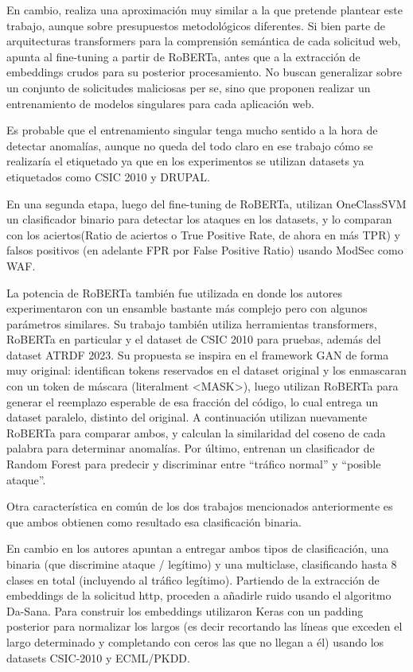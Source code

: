 \documentclass[12pt, a4paper]{article}
\begin{document}
En cambio, \cite{montes2021web} realiza una aproximación muy similar a la que pretende plantear  este trabajo, aunque sobre presupuestos metodológicos diferentes. Si bien parte de arquitecturas transformers para la comprensión semántica de cada solicitud web, apunta al fine-tuning a partir de RoBERTa, antes que a la extracción de embeddings crudos para su posterior procesamiento. No buscan generalizar sobre un conjunto de solicitudes maliciosas per se, sino que proponen realizar un entrenamiento de modelos singulares para cada aplicación web.

Es probable que el entrenamiento singular tenga mucho sentido a la hora de detectar anomalías, aunque no queda del todo claro en ese trabajo cómo se realizaría el etiquetado ya que en los experimentos se utilizan datasets ya etiquetados como CSIC 2010 y DRUPAL.

En una segunda etapa, luego del fine-tuning de RoBERTa, utilizan OneClassSVM un clasificador binario para detectar los ataques en los datasets, y lo comparan con los aciertos(Ratio de aciertos o True Positive Rate, de ahora en más TPR) y falsos positivos (en adelante FPR por False Positive Ratio) usando ModSec como WAF.

La potencia de RoBERTa también fue utilizada en \cite{aharon2024roberta} donde los autores experimentaron con un ensamble bastante más complejo pero con algunos parámetros similares. Su trabajo también utiliza herramientas transformers, RoBERTa en particular y el dataset de CSIC 2010 para pruebas, además del dataset ATRDF 2023. Su propuesta se inspira en el framework GAN de forma muy original: identifican tokens reservados en el dataset original y los enmascaran con un token de máscara (literalment <MASK>), luego utilizan RoBERTa para generar el reemplazo esperable de esa fracción del código, lo cual entrega un dataset paralelo, distinto del original. A continuación utilizan nuevamente RoBERTa para comparar ambos, y calculan la similaridad del coseno de cada palabra para determinar anomalías. Por último, entrenan un clasificador de Random Forest para predecir y discriminar entre \enquote{tráfico normal} y \enquote{posible ataque}.

Otra característica en común de los dos trabajos mencionados anteriormente es que ambos obtienen como resultado esa clasificación binaria.

En cambio en \cite{karacan2021novel} los autores apuntan a entregar ambos tipos de clasificación, una binaria (que discrimine ataque / legítimo) y una multiclase, clasificando hasta 8 clases en total (incluyendo al tráfico legítimo). Partiendo de la extracción de embeddings de la solicitud http, proceden a añadirle ruido usando el algoritmo Da-Sana.
Para construir los embeddings utilizaron Keras con un padding posterior para normalizar los largos (es decir recortando las líneas que exceden el largo determinado y completando con ceros las que no llegan a él) usando los datasets CSIC-2010 y ECML/PKDD.
\end{document}
